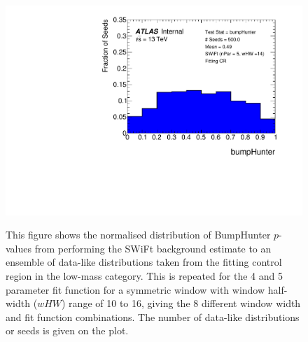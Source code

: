 \begin{figure}[!htb]
{}                                                                                              
 {                                                    
  \includegraphics[width=0.45\linewidth, angle=0]{figs/Dibjet/LowMass/FitStudy/pVal_bumpHunter_corrFitCR_5para_low14_high14.pdf}
}                                                                                              
\vspace{10pt}
\caption{\label{fig:bumpH_spuriousSignal}
  This figure shows the normalised distribution of {\sc BumpHunter} \mbox{$p$-value}s from performing the SWiFt background estimate to an ensemble of
  data-like distributions taken from the fitting control region in the low-mass category.
  This is repeated for the 4 and 5 parameter fit function for a symmetric window with window half-width ($wHW$) range of 10 to 16,
  giving the 8 different window width and fit function combinations.
  The number of data-like distributions or seeds is given on the plot.
}
\end{figure}

